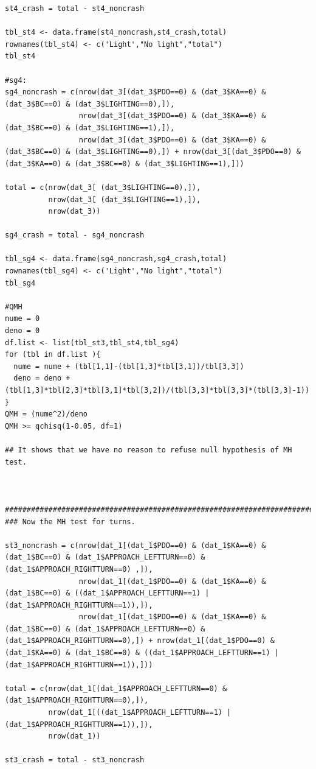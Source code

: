 \documentclass[11pt]{scrartcl} %
\begin{document}
\begin{lstlisting}
st4_crash = total - st4_noncrash

tbl_st4 <- data.frame(st4_noncrash,st4_crash,total)
rownames(tbl_st4) <- c('Light',"No light","total")
tbl_st4

#sg4:
sg4_noncrash = c(nrow(dat_3[(dat_3$PDO==0) & (dat_3$KA==0) & (dat_3$BC==0) & (dat_3$LIGHTING==0),]),
                 nrow(dat_3[(dat_3$PDO==0) & (dat_3$KA==0) & (dat_3$BC==0) & (dat_3$LIGHTING==1),]),
                 nrow(dat_3[(dat_3$PDO==0) & (dat_3$KA==0) & (dat_3$BC==0) & (dat_3$LIGHTING==0),]) + nrow(dat_3[(dat_3$PDO==0) & (dat_3$KA==0) & (dat_3$BC==0) & (dat_3$LIGHTING==1),]))

total = c(nrow(dat_3[ (dat_3$LIGHTING==0),]),
          nrow(dat_3[ (dat_3$LIGHTING==1),]),
          nrow(dat_3))

sg4_crash = total - sg4_noncrash

tbl_sg4 <- data.frame(sg4_noncrash,sg4_crash,total)
rownames(tbl_sg4) <- c('Light',"No light","total")
tbl_sg4

#QMH
nume = 0
deno = 0
df.list <- list(tbl_st3,tbl_st4,tbl_sg4)
for (tbl in df.list ){
  nume = nume + (tbl[1,1]-(tbl[1,3]*tbl[3,1])/tbl[3,3])
  deno = deno + (tbl[1,3]*tbl[2,3]*tbl[3,1]*tbl[3,2])/(tbl[3,3]*tbl[3,3]*(tbl[3,3]-1))
}
QMH = (nume^2)/deno
QMH >= qchisq(1-0.05, df=1)

## It shows that we have no reason to refuse null hypothesis of MH test.



#####################################################################################################
### Now the MH test for turns.

st3_noncrash = c(nrow(dat_1[(dat_1$PDO==0) & (dat_1$KA==0) & (dat_1$BC==0) & (dat_1$APPROACH_LEFTTURN==0) & (dat_1$APPROACH_RIGHTTURN==0) ,]),
                 nrow(dat_1[(dat_1$PDO==0) & (dat_1$KA==0) & (dat_1$BC==0) & ((dat_1$APPROACH_LEFTTURN==1) | (dat_1$APPROACH_RIGHTTURN==1)),]),
                 nrow(dat_1[(dat_1$PDO==0) & (dat_1$KA==0) & (dat_1$BC==0) & (dat_1$APPROACH_LEFTTURN==0) & (dat_1$APPROACH_RIGHTTURN==0),]) + nrow(dat_1[(dat_1$PDO==0) & (dat_1$KA==0) & (dat_1$BC==0) & ((dat_1$APPROACH_LEFTTURN==1) | (dat_1$APPROACH_RIGHTTURN==1)),]))

total = c(nrow(dat_1[(dat_1$APPROACH_LEFTTURN==0) & (dat_1$APPROACH_RIGHTTURN==0),]),
          nrow(dat_1[((dat_1$APPROACH_LEFTTURN==1) | (dat_1$APPROACH_RIGHTTURN==1)),]),
          nrow(dat_1))

st3_crash = total - st3_noncrash


\end{lstlisting}
\end{document}
